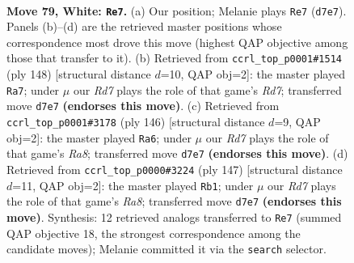\documentclass[11pt]{article}
\begin{document}
\clearpage

\begin{figure}[p]\centering
\begin{subfigure}{0.46\textwidth}\centering
\resizebox{\linewidth}{!}{%
\newchessgame
\chessboard[
  setfen={5rk1/P2R4/8/8/8/8/7K/8 w - - 27 79},
  showmover=false,
  pgfstyle=straightmove, color=movearrow, markmove={d7-e7}
]}
\caption{}
\end{subfigure}\hfill
\begin{subfigure}{0.46\textwidth}\centering
\resizebox{\linewidth}{!}{%
\newchessgame
\chessboard[
  setfen={8/3R4/8/6pP/4kr2/8/8/3K4 w - - 16 75},
  showmover=false,
  pgfstyle=straightmove, color=movearrow, markmove={d7-a7}
]}
\caption{}
\end{subfigure}
\\[4pt]
\begin{subfigure}{0.46\textwidth}\centering
\resizebox{\linewidth}{!}{%
\newchessgame
\chessboard[
  setfen={R7/4rk2/8/5PK1/8/5P2/8/8 w - - 17 74},
  showmover=false,
  pgfstyle=straightmove, color=movearrow, markmove={a8-a6}
]}
\caption{}
\end{subfigure}\hfill
\begin{subfigure}{0.46\textwidth}\centering
\resizebox{\linewidth}{!}{%
\newchessgame
\chessboard[
  setfen={8/8/6k1/6p1/8/8/5RKP/r7 b - - 11 74},
  showmover=false,
  pgfstyle=straightmove, color=movearrow, markmove={a1-b1}
]}
\caption{}
\end{subfigure}
\caption{\textbf{Move 79, White: \texttt{Re7}.} (a) Our position; Melanie plays \texttt{Re7} (\texttt{d7e7}). Panels (b)--(d) are the retrieved master positions whose correspondence most drove this move (highest QAP objective among those that transfer to it). (b) Retrieved from \texttt{ccrl\_top\_p0001\#1514} (ply 148) [structural distance $d$=10, QAP obj=2]: the master played \texttt{Ra7}; under $\mu$ our \emph{Rd7} plays the role of that game's \emph{Rd7}; transferred move \texttt{d7e7} \textbf{(endorses this move)}. (c) Retrieved from \texttt{ccrl\_top\_p0001\#3178} (ply 146) [structural distance $d$=9, QAP obj=2]: the master played \texttt{Ra6}; under $\mu$ our \emph{Rd7} plays the role of that game's \emph{Ra8}; transferred move \texttt{d7e7} \textbf{(endorses this move)}. (d) Retrieved from \texttt{ccrl\_top\_p0000\#3224} (ply 147) [structural distance $d$=11, QAP obj=2]: the master played \texttt{Rb1}; under $\mu$ our \emph{Rd7} plays the role of that game's \emph{Ra8}; transferred move \texttt{d7e7} \textbf{(endorses this move)}. Synthesis: 12 retrieved analogs transferred to \texttt{Re7} (summed QAP objective 18, the strongest correspondence among the candidate moves); Melanie committed it via the \texttt{search} selector.}
\label{fig:thought-m156}
\end{figure}
\end{document}
